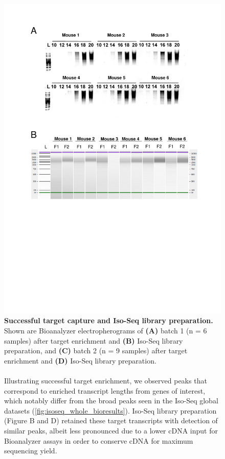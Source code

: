 \begin{figure}[!htp]
	\centering
	\vspace{20pt}
	\includegraphics[page=2,trim={0 15cm 0cm 1cm},clip,scale = 0.75]{Figures/TargetedTranscriptome_LabResults.pdf}
	\captionsetup{width=0.95\textwidth}
	\caption[Iso-Seq targeted profiling - target capture \& SMRTbell library preparation]%
	{\textbf{Successful target capture and Iso-Seq library preparation.} Shown are Bioanalyzer electropherograms of \textbf{(A)} batch 1 (n = 6 samples) after target enrichment and \textbf{(B)} Iso-Seq library preparation, and \textbf{(C)} batch 2 (n = 9 samples) after target enrichment and \textbf{(D)} Iso-Seq library preparation. 
	\\
	\\
	Illustrating successful target enrichment, we observed peaks that correspond to enriched transcript lengths from genes of interest, which notably differ from the broad peaks seen in the Iso-Seq global datasets (\cref{fig:isoseq_whole_bioresults}). Iso-Seq library preparation (Figure B and D) retained these target transcripts with detection of similar peaks, albeit less pronounced due to a lower cDNA input for Bioanalyzer assays in order to conserve cDNA for maximum sequencing yield.}  
	\label{fig:isoseq_targeted_libresults}
\end{figure}

